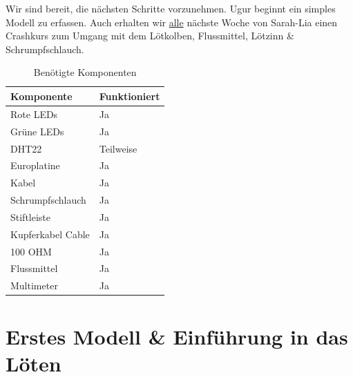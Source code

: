 \documentclass[12pt]{article}
\begin{document}
Wir sind bereit, die nächsten Schritte vorzunehmen. Ugur beginnt ein simples Modell zu erfassen. Auch erhalten wir \underline{alle} nächste Woche von Sarah-Lia einen Crashkurs zum Umgang mit dem Lötkolben, Flussmittel, Lötzinn \& Schrumpfschlauch.
\begin{table}[H]
\begin{tabular}{l|l}
Komponente & Funktioniert \\ \hline
\hline
Rote LEDs   & Ja \\ \hline
Grüne LEDs   & Ja \\ \hline
DHT22   & Teilweise \\ \hline
Europlatine   & Ja \\ \hline
Kabel  & Ja  \\ \hline
Schrumpfschlauch & Ja \\ \hline
Stiftleiste   & Ja \\ \hline
Kupferkabel Cable  & Ja \\ \hline
100 OHM  & Ja \\ \hline
Flussmittel & Ja \\ \hline
Multimeter & Ja \\ \hline
\end{tabular}
\caption{Benötigte Komponenten}
\label{Tab:table1}
\end{table}
\section{Erstes Modell \& Einführung in das Löten}
\end{document}
